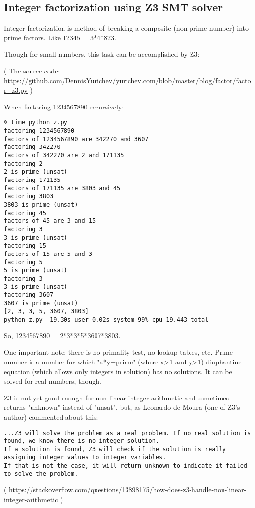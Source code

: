 \subsection{Integer factorization using Z3 SMT solver}
\label{factor_Z3}

Integer factorization is method of breaking a composite (non-prime number) into prime factors.
Like 12345 = 3*4*823.

Though for small numbers, this task can be accomplished by Z3:



( The source code: \url{https://github.com/DennisYurichev/yurichev.com/blob/master/blog/factor/factor_z3.py} )

When factoring 1234567890 recursively:

\begin{lstlisting}
% time python z.py
factoring 1234567890
factors of 1234567890 are 342270 and 3607
factoring 342270
factors of 342270 are 2 and 171135
factoring 2
2 is prime (unsat)
factoring 171135
factors of 171135 are 3803 and 45
factoring 3803
3803 is prime (unsat)
factoring 45
factors of 45 are 3 and 15
factoring 3
3 is prime (unsat)
factoring 15
factors of 15 are 5 and 3
factoring 5
5 is prime (unsat)
factoring 3
3 is prime (unsat)
factoring 3607
3607 is prime (unsat)
[2, 3, 3, 5, 3607, 3803]
python z.py  19.30s user 0.02s system 99% cpu 19.443 total
\end{lstlisting}

So, 1234567890 = 2*3*3*5*3607*3803.

One important note: there is no primality test, no lookup tables, etc.
Prime number is a number for which "x*y=prime" (where x>1 and y>1) diophantine equation (which allows only integers in solution) has no solutions.
It can be solved for real numbers, though.

Z3 is \href{https://github.com/Z3Prover/z3/issues/1264}{not yet good enough for non-linear integer arithmetic}
and sometimes returns "unknown" instead of "unsat", but,
as Leonardo de Moura (one of Z3's author) commented about this:

\begin{lstlisting}
...Z3 will solve the problem as a real problem. If no real solution is found, we know there is no integer solution.
If a solution is found, Z3 will check if the solution is really assigning integer values to integer variables.
If that is not the case, it will return unknown to indicate it failed to solve the problem.
\end{lstlisting}
( \url{https://stackoverflow.com/questions/13898175/how-does-z3-handle-non-linear-integer-arithmetic} )

